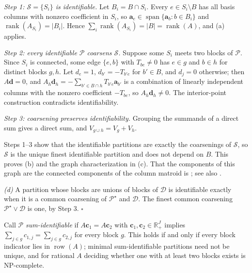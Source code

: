 \emph{Step 1: \(\mathcal S=\{S_i\}\) is identifiable.}  Let \(B_i=B\cap S_i\).  Every
\(e\in S_i\setminus B\) has all basis columns with nonzero coefficient in \(S_i\),
so \(\mathbf a_e\in\operatorname{span}\{\mathbf a_b:b\in B_i\}\) and
\(\operatorname{rank}(A_{S_i})=|B_i|\).  Hence
\(\sum_i\operatorname{rank}(A_{S_i})=|B|=\operatorname{rank}(A)\), and (a) applies.

\emph{Step 2: every identifiable \(\mathcal P\) coarsens \(\mathcal S\).}  Suppose
some \(S_i\) meets two blocks of \(\mathcal P\).  Since \(S_i\) is connected, some
edge \(\{e,b\}\) with \(T_{be}\ne0\) has \(e\in g\) and \(b\in h\) for distinct blocks
\(g,h\).  Let \(d_e=1\), \(d_{b'}=-T_{b'e}\) for \(b'\in B\), and \(d_j=0\)
otherwise; then \(A\mathbf d=0\), and
\(A_h\mathbf d_h=-\sum_{b'\in B\cap h}T_{b'e}\mathbf a_{b'}\) is a combination of
linearly independent columns with the nonzero coefficient \(-T_{be}\), so
\(A_h\mathbf d_h\ne0\).  The interior-point construction contradicts
identifiability.

\emph{Step 3: coarsening preserves identifiability.}  Grouping the summands of a
direct sum gives a direct sum, and \(V_{g\cup h}=V_g+V_h\).

Steps 1--3 show that the identifiable partitions are exactly the coarsenings of
\(\mathcal S\), so \(\mathcal S\) is the unique finest identifiable partition and
does not depend on \(B\).  This proves (b) and the graph characterization in (c).
That the components of this graph are the connected components of the column
matroid is \citet{krogdahl1977dependence}; see also \citet{oxley2011matroid}.

\emph{(d)}  A partition whose blocks are unions of blocks of \(\mathcal D\) is
identifiable exactly when it is a common coarsening of \(\mathcal P^\star\) and
\(\mathcal D\).  The finest common coarsening \(\mathcal P^\star\vee\mathcal D\) is
one, by Step 3.  \(\square\)

\begin{proposition}
\label{prop:sum_identifiable}
Call \(\mathcal P\) \emph{sum-identifiable} if \(A\mathbf c_1=A\mathbf c_2\) with
\(\mathbf c_1,\mathbf c_2\in\mathbb R_+^J\) implies
\(\sum_{j\in g}c_{1,j}=\sum_{j\in g}c_{2,j}\) for every block \(g\).  This holds if and
only if every block indicator lies in \(\operatorname{row}(A)\); minimal
sum-identifiable partitions need not be unique, and for rational \(A\) deciding whether
one with at least two blocks exists is NP-complete.
\end{proposition}

